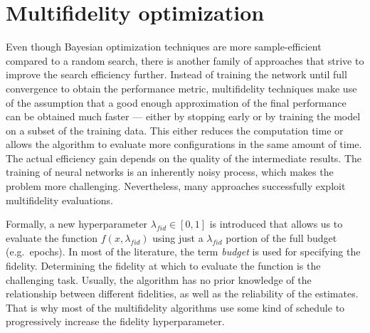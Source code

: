 \chapter{Multifidelity optimization}

Even though Bayesian optimization techniques are more sample-efficient compared to a random search, there is another family of approaches that strive to improve the search efficiency further. Instead of training the network until full convergence to obtain the performance metric, multifidelity techniques make use of the assumption that a good enough approximation of the final performance can be obtained much faster --- either by stopping early or by training the model on a subset of the training data. This either reduces the computation time or allows the algorithm to evaluate more configurations in the same amount of time. The actual efficiency gain depends on the quality of the intermediate results. The training of neural networks is an inherently noisy process, which makes the problem more challenging. Nevertheless, many approaches successfully exploit multifidelity evaluations.

Formally, a new hyperparameter $\lambda_{fid}\in [0,1]$ is introduced that allows us to evaluate the function $f(x, \lambda_{fid})$ using just a $\lambda_{fid}$ portion of the full budget (e.g.\ epochs). In most of the literature, the term \textit{budget} is used for specifying the fidelity. Determining the fidelity at which to evaluate the function is the challenging task. Usually, the algorithm has no prior knowledge of the relationship between different fidelities, as well as the reliability of the estimates. That is why most of the multifidelity algorithms use some kind of schedule to progressively increase the fidelity hyperparameter.


